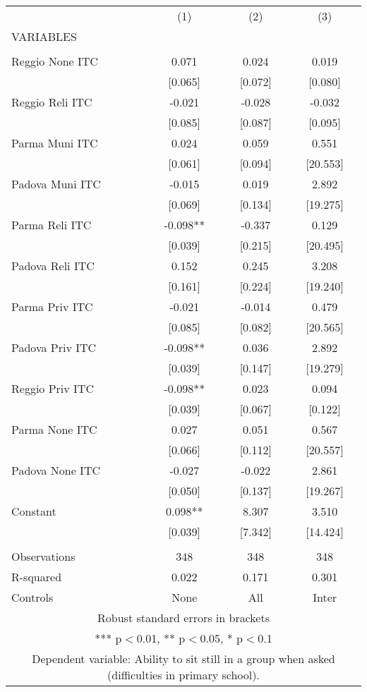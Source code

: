 \begin{tabular}{lccc} \hline
 & (1) & (2) & (3) \\
VARIABLES &  &  &  \\ \hline
 &  &  &  \\
Reggio None ITC & 0.071 & 0.024 & 0.019 \\
 & [0.065] & [0.072] & [0.080] \\
Reggio Reli ITC & -0.021 & -0.028 & -0.032 \\
 & [0.085] & [0.087] & [0.095] \\
Parma Muni ITC & 0.024 & 0.059 & 0.551 \\
 & [0.061] & [0.094] & [20.553] \\
Padova Muni ITC & -0.015 & 0.019 & 2.892 \\
 & [0.069] & [0.134] & [19.275] \\
Parma Reli ITC & -0.098** & -0.337 & 0.129 \\
 & [0.039] & [0.215] & [20.495] \\
Padova Reli ITC & 0.152 & 0.245 & 3.208 \\
 & [0.161] & [0.224] & [19.240] \\
Parma Priv ITC & -0.021 & -0.014 & 0.479 \\
 & [0.085] & [0.082] & [20.565] \\
Padova Priv ITC & -0.098** & 0.036 & 2.892 \\
 & [0.039] & [0.147] & [19.279] \\
Reggio Priv ITC & -0.098** & 0.023 & 0.094 \\
 & [0.039] & [0.067] & [0.122] \\
Parma None ITC & 0.027 & 0.051 & 0.567 \\
 & [0.066] & [0.112] & [20.557] \\
Padova None ITC & -0.027 & -0.022 & 2.861 \\
 & [0.050] & [0.137] & [19.267] \\
Constant & 0.098** & 8.307 & 3.510 \\
 & [0.039] & [7.342] & [14.424] \\
 &  &  &  \\
Observations & 348 & 348 & 348 \\
R-squared & 0.022 & 0.171 & 0.301 \\
 Controls & None & All & Inter \\ \hline
\multicolumn{4}{c}{ Robust standard errors in brackets} \\
\multicolumn{4}{c}{ *** p$<$0.01, ** p$<$0.05, * p$<$0.1} \\
\multicolumn{4}{c}{ Dependent variable: Ability to sit still in a group when asked (difficulties in primary school).} \\
\end{tabular}
